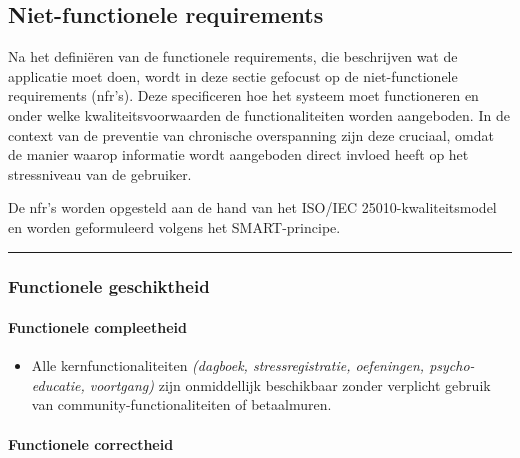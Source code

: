 \subsection{Niet-functionele requirements}
\label{subsec:nfrs}

\vspace{1em}

Na het definiëren van de functionele requirements, die beschrijven wat de applicatie moet doen, wordt in deze sectie gefocust op de niet-functionele requirements (\acrshort{nfr}’s). Deze specificeren hoe het systeem moet functioneren en onder welke kwaliteitsvoorwaarden de functionaliteiten worden aangeboden. In de context van de preventie van chronische overspanning zijn deze cruciaal, omdat de manier waarop informatie wordt aangeboden direct invloed heeft op het stressniveau van de gebruiker.

\vspace{1em}

De \acrshort{nfr}’s worden opgesteld aan de hand van het ISO/IEC 25010-kwaliteitsmodel \parencite{iso25010_2023} en worden geformuleerd volgens het SMART-principe.

\vspace{1em}
\vspace{1em}
\hrule
\vspace{1em}

\subsubsection{Functionele geschiktheid}
\label{subsubsec:functionele-geschiktheid}

\vspace{1em}

\paragraph{Functionele compleetheid}
\vspace{1em}

\begin{itemize}
    \item Alle kernfunctionaliteiten \textit{(dagboek, stressregistratie, oefeningen, psycho- \newline educatie, voortgang)} zijn onmiddellijk beschikbaar zonder verplicht gebruik van community-functionaliteiten of betaalmuren.
\end{itemize}

\paragraph{Functionele correctheid}
\vspace{1em}

